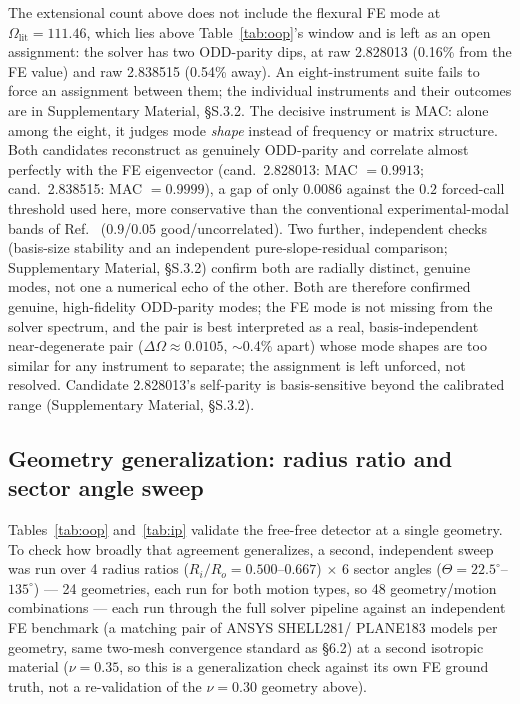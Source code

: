 \documentclass[11pt]{article}
\begin{document}
The extensional count above does not include the flexural FE mode at
$\Omega_{\mathrm{lit}}=111.46$, which lies above Table~\ref{tab:oop}'s
window and is left as an open assignment: the solver has two ODD-parity
dips, at raw 2.828013 (0.16\% from the FE value) and raw 2.838515
(0.54\% away). An eight-instrument suite fails to force an assignment
between them; the individual instruments and their outcomes are in
Supplementary Material, §S.3.2. The decisive instrument is MAC: alone among the eight, it judges mode \emph{shape} instead of frequency or matrix structure. Both candidates reconstruct as genuinely ODD-parity and
correlate almost perfectly with the FE eigenvector (cand.\ 2.828013:
MAC $=0.9913$; cand.\ 2.838515: MAC $=0.9999$), a gap of only 0.0086
against the $0.2$ forced-call threshold used here, more conservative
than the conventional experimental-modal bands of
Ref.~\cite{allemang2003} ($0.9$/$0.05$ good/uncorrelated). Two further,
independent checks (basis-size stability and an independent
pure-slope-residual comparison; Supplementary Material, §S.3.2) confirm
both are radially distinct, genuine modes, not one a numerical echo of
the other. Both are therefore confirmed genuine, high-fidelity
ODD-parity modes; the FE mode is not missing from the solver spectrum,
and the pair is best interpreted as a real, basis-independent
near-degenerate pair ($\Delta\Omega\approx0.0105$, ${\sim}$0.4\% apart)
whose mode shapes are too similar for any instrument to separate; the
assignment is left unforced, not resolved. Candidate 2.828013's
self-parity is basis-sensitive beyond the calibrated range
(Supplementary Material, §S.3.2).

\subsection{Geometry generalization: radius ratio and sector angle sweep}\label{sec:geomsweep}
Tables~\ref{tab:oop} and~\ref{tab:ip} validate the free-free detector at a
single geometry. To check how broadly that agreement generalizes, a second, independent sweep was run over 4 radius ratios ($R_i/R_o=0.500$--$0.667$) $\times$ 6 sector
angles ($\Theta=22.5^\circ$--$135^\circ$) --- 24 geometries, each run for
both motion types, so 48 geometry/motion combinations --- each run through the full solver pipeline
against an independent FE benchmark (a matching pair of ANSYS SHELL281/
PLANE183 models per geometry, same two-mesh convergence standard as
\S6.2) at a second isotropic material ($\nu=0.35$, so this is a
generalization check against its own FE ground truth, not a
re-validation of the $\nu=0.30$ geometry above).
\end{document}
